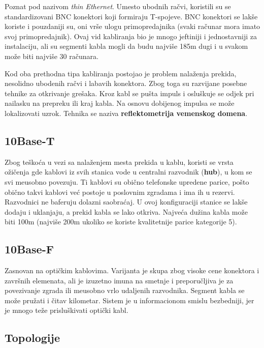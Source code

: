 \documentclass{article} %
\begin{document}
Poznat pod nazivom \textit{thin Ethernet}. Umesto ubodnih ra\v{c}vi, koristili su se standardizovani BNC konektori koji formiraju T-spojeve. BNC konektori se lak\v{s}e koriste i pouzdaniji su, oni vr\v{s}e ulogu primopredajnika (svaki ra\v{c}unar mora imato svoj primopredajnik). Ovaj vid kabliranja bio je mnogo jeftiniji i jednostavniji za instalaciju, ali su segmenti kabla mogli da budu najvi\v{s}e 185m dugi i u svakom mo\v{z}e biti najvi\v{s}e 30 ra\v{c}unara.

Kod oba prethodna tipa kabliranja postojao je problem nala\v{z}enja prekida, nesolidno ubodenih ra\v{c}vi i labavih konektora. Zbog toga su razvijane posebne tehnike za otkrivanje gre\v{s}aka. Kroz kabl se pu\v{s}ta impuls i oslu\v{s}kuje se odjek pri nailasku na prepreku ili kraj kabla. Na osnovu dobijenog impulsa se mo\v{z}e lokalizovati uzrok. Tehnika se naziva \textbf{reflektometrija vemenskog domena}.

\subsection{10Base-T}

Zbog te\v{s}ko\'{c}a u vezi sa nala\v{z}enjem mesta prekida u kablu, koristi se vrsta o\v{z}i\v{c}enja gde kablovi iz svih stanica vode u centralni razvodnik (\textbf{hub}), u kom se svi me\dj{}usobno povezuju. Ti kablovi su obi\v{c}no telefonske upredene parice, po\v{s}to obi\v{c}no takvi kablovi ve\'{c} postoje u poslovnim zgradama i ima ih u rezervi. Razvodnici ne baferuju dolazni saobra\'{c}aj. U ovoj konfiguraciji stanice se lak\v{s}e dodaju i uklanjaju, a prekid kabla se lako otkriva. Najve\'{c}a du\v{z}ina kabla mo\v{z}e biti 100m (najvi\v{s}e 200m ukoliko se koriste kvalitetnije parice kategorije 5).

\subsection{10Base-F}

Zasnovan na opti\v{c}kim kablovima. Varijanta je skupa zbog visoke cene konektora i zavr\v{s}nih elemenata, ali je izuzetno imuna na smetnje i preporu\v{c}ljiva je za povezivanje zgrada ili me\dj{}usobno vrlo udaljenih razvodnika. Segment kabla se mo\v{z}e pru\v{z}ati i \v{c}itav kilometar. Sistem je u informacionom smislu bezbedniji, jer je mnogo te\v{z}e prislu\v{s}kivati opti\v{c}ki kabl. 

\subsection{Topologije}
\end{document}
